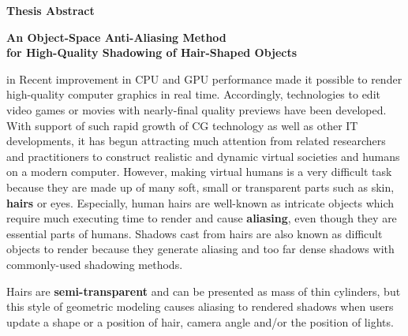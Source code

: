 \begin{center}
{\bf {\large Thesis Abstract}}

\vspace{2ex}

{\bf {\large An Object-Space Anti-Aliasing Method\\for High-Quality Shadowing of Hair-Shaped Objects}}
\end{center}

\vspace{3ex}

 in
Recent improvement in CPU and GPU performance made it possible to render high-quality computer graphics in real time.
%
Accordingly, technologies to edit video games or movies with nearly-final quality previews have been developed.
%
With support of such rapid growth of CG technology as well as other IT developments, it has begun attracting much attention from related researchers and practitioners to construct realistic and dynamic virtual societies and humans on a modern computer.
%
However, making virtual humans is a very difficult task because they are made up of many soft, small or transparent parts such as skin, \textbf{hairs} or eyes.
%
Especially, human hairs are well-known as intricate objects which require much executing time to render and cause \textbf{aliasing}, even though they are essential parts of humans.
%
Shadows cast from hairs are also known as difficult objects to render because they generate aliasing and too far dense shadows with commonly-used shadowing methods.\par
%
Hairs are \textbf{semi-transparent} and can be presented as mass of thin cylinders, but this style of geometric modeling causes aliasing to rendered shadows when users update a shape or a position of hair, camera angle and/or the position of lights.
